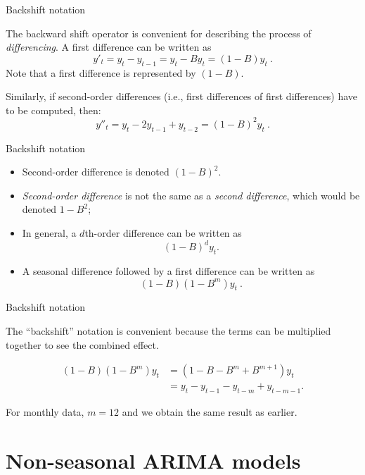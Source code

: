 \documentclass[14pt,ignorenonframetext,]{beamer}
\begin{document}
\begin{frame}{Backshift notation}

The backward shift operator is convenient for describing the process of
\textit{differencing}. \pause
A first difference can be written as \[
y'_{t}  =  y_{t} -   y_{t-1} = y_t - By_{t}  =  (1 - B)y_{t}\: .
\]\pause
Note that a first difference is represented by \((1 - B)\). \pause

Similarly, if second-order differences (i.e., first differences of first
differences) have to be computed, then: \[
y''_{t}  =  y_{t} -   2y_{t - 1}  +  y_{t - 2} = (1 - B)^{2} y_{t}\: .
\]

\end{frame}

\begin{frame}{Backshift notation}

\begin{itemize}
\item
  Second-order difference is denoted \((1- B)^{2}\).
\item
  \textit{Second-order  difference} is not the same as a
  \textit{second  difference}, which would be denoted \(1- B^{2}\);
\item
  In general, a \(d\)th-order difference can be written as
  \[(1 - B)^{d} y_{t}.\]
\item
  A seasonal difference followed by a first difference can be written as
  \[ (1-B)(1-B^m)y_t\: .\]
\end{itemize}

\end{frame}

\begin{frame}{Backshift notation}

The ``backshift'' notation is convenient because the terms can be
multiplied together to see the combined effect.

\begin{align*}
(1-B)(1-B^m)y_t &= (1 - B - B^m + B^{m+1})y_t \\
&= y_t-y_{t-1}-y_{t-m}+y_{t-m-1}.
\end{align*}

\pause
For monthly data, \(m=12\) and we obtain the same result as earlier.

\end{frame}

\section{Non-seasonal ARIMA models}\label{non-seasonal-arima-models}
\end{document}
